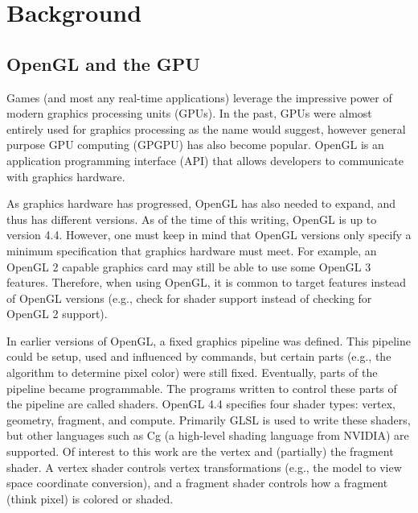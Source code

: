 \section{Background}

\subsection{OpenGL and the GPU}
Games (and most any real-time applications) leverage the impressive power of modern graphics processing units (GPUs).
In the past, GPUs were almost entirely used for graphics processing as the name would suggest, however general purpose GPU computing (GPGPU) has also become popular.
OpenGL is an application programming interface (API) that allows developers to communicate with graphics hardware.

As graphics hardware has progressed, OpenGL has also needed to expand, and thus has different versions.
As of the time of this writing, OpenGL is up to version 4.4.
However, one must keep in mind that OpenGL versions only specify a minimum specification that graphics hardware must meet.
For example, an OpenGL 2 capable graphics card may still be able to use some OpenGL 3 features.
Therefore, when using OpenGL, it is common to target features instead of OpenGL versions (e.g., check for shader support instead of checking for OpenGL 2 support).

In earlier versions of OpenGL, a fixed graphics pipeline was defined.
This pipeline could be setup, used and influenced by commands, but certain parts (e.g., the algorithm to determine pixel color) were still fixed.
Eventually, parts of the pipeline became programmable.
The programs written to control these parts of the pipeline are called shaders.
OpenGL 4.4 specifies four shader types: vertex, geometry, fragment, and compute.
Primarily GLSL is used to write these shaders, but other languages such as Cg (a high-level shading language from NVIDIA) are supported.
Of interest to this work are the vertex and (partially) the fragment shader.
A vertex shader controls vertex transformations (e.g., the model to view space coordinate conversion), and a fragment shader controls how a fragment (think pixel) is colored or shaded.

